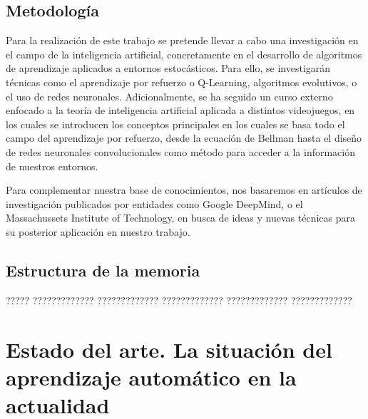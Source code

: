 \documentclass[11pt,spanish,listoffigures,listoftables]{tfgetsinf}
\begin{document}
\section{Metodología}

Para la realización de este trabajo se pretende llevar a cabo una investigación en el campo de la inteligencia artificial, concretamente en el desarrollo de algoritmos de aprendizaje aplicados a entornos estocásticos. Para ello, se investigarán técnicas como el aprendizaje por refuerzo o Q-Learning, algoritmos evolutivos, o el uso de redes neuronales. Adicionalmente, se ha seguido un curso externo enfocado a la teoría de inteligencia artificial aplicada a distintos videojuegos, en los cuales se introducen los conceptos principales en los cuales se basa todo el campo del aprendizaje por refuerzo, desde la ecuación de Bellman hasta el diseño de redes neuronales convolucionales como método para acceder a la información de nuestros entornos. \par

Para complementar nuestra base de conocimientos, nos basaremos en artículos de investigación publicados por entidades como Google DeepMind, o el Massachussets Institute of Technology, en busca de ideas y nuevas técnicas para su posterior aplicación en nuestro trabajo.


\section{Estructura de la memoria}

????? ????????????? ????????????? ????????????? ????????????? ????????????? 





\chapter{Estado del arte. La situación del aprendizaje automático en la actualidad}
\end{document}
